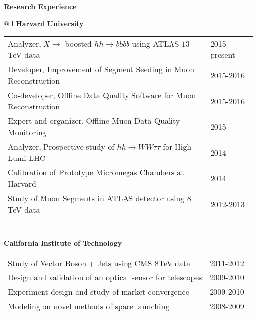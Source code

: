 \documentclass[letterpaper,11pt,oneside]{article}
\begin{document}
 \raggedright
 \textbf{\Large{Research Experience}} \\
 \normalsize
\begin{flushleft}
\hspace{1cm}
 \begin{tabular}{@{} l}
    \textbf{Harvard University} \\ 
    \vspace{0.2cm}
    \begin{tabular}{@{} l l }
 Analyzer, $X \to$ boosted $ hh \to b\bar{b}b\bar{b}$ using ATLAS $13$TeV data & 2015-present\\
 Developer, Improvement of Segment Seeding in Muon Reconstruction & 2015-2016\\
 Co-developer, Offline Data Quality Software for Muon Reconstruction & 2015-2016\\
 Expert and organizer,  Offline Muon Data Quality Monitoring & 2015\\
 Analyzer, Prospective study of $hh \to WW\tau\tau$ for High Lumi LHC & 2014\\
 Calibration of Prototype Micromegas Chambers at Harvard & 2014\\
 Study of Muon Segments in ATLAS detector using $8$TeV data & 2012-2013\\
    \hspace{0.8\linewidth} & \hspace{0.1\linewidth} \\
     \end{tabular}
     \\
     \textbf{California Institute of Technology} \\
     \vspace{0.2cm}
     \begin{tabular}{@{} l l }
 Study of Vector Boson + Jets using CMS $8$TeV data&2011-2012\\
 Design and validation of an optical sensor for telescopes&2009-2010\\
 Experiment design and study of market convergence &2009-2010\\
 Modeling on novel methods of space launching&2008-2009\\
    \hspace{0.8\linewidth} & \hspace{0.1\linewidth} \\
      \end{tabular}
      \end{tabular}
\end{flushleft}
\end{document}
